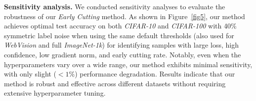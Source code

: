 \textbf{Sensitivity analysis.}
We conducted sensitivity analyses to evaluate the robustness of our \emph{Early Cutting} method. As shown in Figure~\ref{fig5}, our method achieves optimal test accuracy on both \emph{CIFAR-10} and \emph{CIFAR-100} with 40\% symmetric label noise when using the same default thresholds (also used for \emph{WebVision} and full \emph{ImageNet-1k}) for identifying samples with large loss, high confidence, low gradient norm, and early cutting rate. Notably, even when the hyperparameters vary over a wide range, our method exhibits minimal sensitivity, with only slight ($<1\%$) performance degradation. Results indicate that our method is robust and effective across different datasets without requiring extensive hyperparameter tuning.

